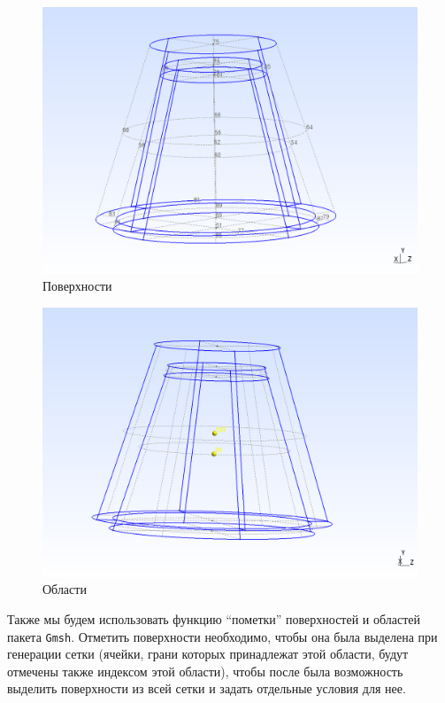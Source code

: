 \documentclass[a4paper, 14pt]{extreport}
\begin{document}
\begin{figure}[H]
	\center
	\includegraphics[scale=0.35]{pictures/surfaces.png}
	\caption{Поверхности}
	\label{fig: surfaces}
\end{figure}

\begin{figure}[H]
	\center
	\includegraphics[scale=0.4]{pictures/volumes.png}
	\caption{Области}
	\label{fig: volumes}
\end{figure}

Также мы будем использовать функцию \enquote{пометки} поверхностей и областей пакета \texttt{Gmsh}. Отметить поверхности необходимо, чтобы она была выделена при генерации сетки (ячейки, грани которых принадлежат этой области, будут отмечены также индексом этой области), чтобы после была возможность выделить поверхности из всей сетки и задать отдельные условия для нее.
\end{document}

